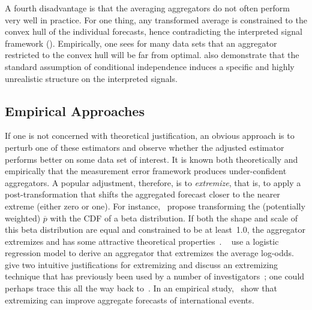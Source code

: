 \documentclass[11pt]{article}
\theoremstyle{definition}
\theoremstyle{definition}
\def\pb{\overline{p}}
\begin{document}
A fourth disadvantage is that the averaging aggregators do not often perform
very well in practice. For one thing, any transformed average is constrained to
the convex hull of the individual forecasts, hence contradicting the
interpreted signal framework (\citealt{parunak2013characterizing}).  Empirically, one sees
for many data sets that an aggregator restricted to the convex hull
will be far from optimal. \cite{hong2009interpreted} also demonstrate that the standard
assumption of conditional independence induces a specific and highly
unrealistic structure on the interpreted signals.

\subsection{Empirical Approaches}
\label{ss:empirical}

If one is not concerned with theoretical justification, an obvious
approach is to perturb one of these estimators and observe whether the
adjusted estimator performs better on some data set of interest.  It
is known both theoretically and empirically that the measurement error
framework produces under-confident aggregators.  A popular adjustment,
therefore, is to {\em extremize}, that is, to apply a
post-transformation that shifts the aggregated forecast closer to the
nearer extreme (either zero or one).  For instance,~\citet{Ranjan08}
propose transforming the (potentially weighted) $\pb$ with the CDF of a
beta distribution.  If both the shape and scale of this beta
distribution are equal and constrained to be at least~1.0, the
aggregator extremizes and has some attractive theoretical
properties~\citep{Wallsten2001}.  ~\citet{satopaa} use a logistic
regression model to derive an aggregator that extremizes the average
log-odds.  ~\citet{baron2014two} give two intuitive justifications for
extremizing and discuss an extremizing technique that has previously
been used by a number of investigators~\citep{Erev1994,
shlomi2010subjective}; one could perhaps trace this all the way back
to~\citet{karmarkar1978subjectively}.  In an empirical
study,~\citet{mellers2014psychological} show that extremizing can
improve aggregate forecasts of international events.
\end{document}
